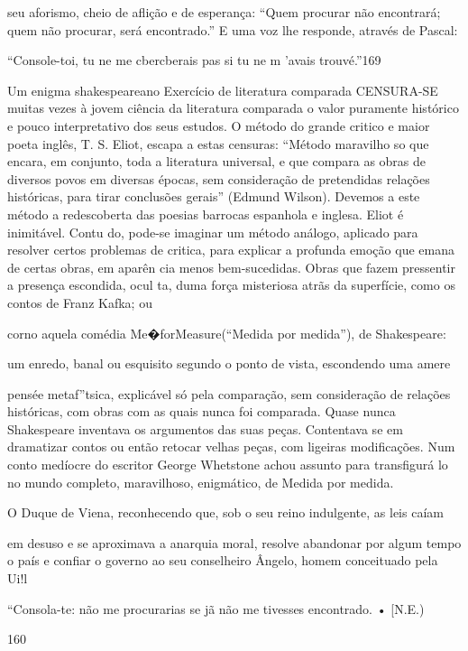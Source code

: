 seu aforismo, cheio de aflição e de esperança: ``Quem procurar não
encontrará; quem não procurar, será encontrado.'' E uma voz lhe
responde, através de Pascal:

``Console-toi, tu ne me cbercberais pas si tu ne m 'avais trouvé.''169

Um enigma shakespeareano Exercício de literatura comparada CENSURA-SE
muitas vezes à jovem ciência da literatura comparada o valor puramente
histórico e pouco interpretativo dos seus estudos. O método do grande
critico e maior poeta inglês, T. S. Eliot, escapa a estas censuras:
``Método maravilho­ so que encara, em conjunto, toda a literatura
universal, e que compara as obras de diversos povos em diversas épocas,
sem consideração de pretendidas relações históricas, para tirar
conclusões gerais'' (Edmund Wilson). Devemos a este método a
redescoberta das poesias barrocas espanhola e inglesa. Eliot é
inimitável. Contu­ do, pode-se imaginar um método análogo, aplicado para
resolver certos problemas de critica, para explicar a profunda emoção
que emana de certas obras, em aparên­ cia menos bem-sucedidas. Obras que
fazem pressentir a presença escondida, ocul­ ta, duma força misteriosa
atrãs da superfície, como os contos de Franz Kafka; ou

corno aquela comédia Me�forMeasure(``Medida por medida''), de
Shakespeare:

um enredo, banal ou esquisito segundo o ponto de vista, escondendo uma
amere­

pensée metaf''tsica, explicável só pela comparação, sem consideração de
relações históricas, com obras com as quais nunca foi comparada. Quase
nunca Shakespeare inventava os argumentos das suas peças. Contentava­ se
em dramatizar contos ou então retocar velhas peças, com ligeiras
modificações. Num conto medíocre do escritor George Whetstone achou
assunto para transfigurá­ lo no mundo completo, maravilhoso, enigmático,
de Medida por medida.

O Duque de Viena, reconhecendo que, sob o seu reino indulgente, as leis
caíam

em desuso e se aproximava a anarquia moral, resolve abandonar por algum
tempo o país e confiar o governo ao seu conselheiro Ângelo, homem
conceituado pela Ui!l

``Consola-te: não me procurarias se jã não me tivesses encontrado. •
{[}N.E.)

160


